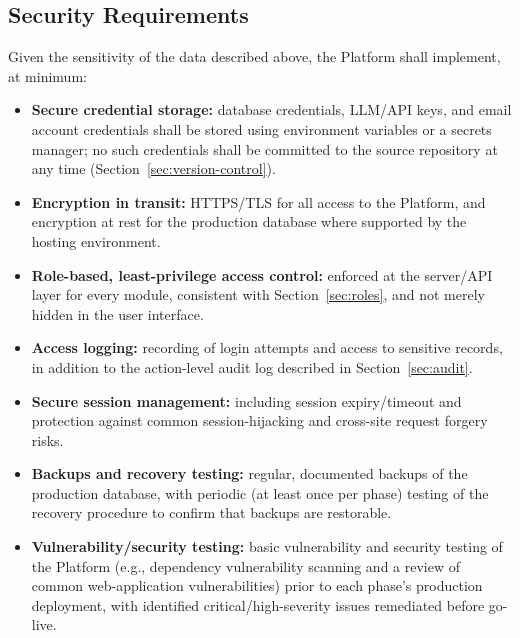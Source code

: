 \documentclass[11pt]{article}
\begin{document}
\subsection{Security Requirements}
\label{sec:security}
Given the sensitivity of the data described above, the Platform shall implement, at minimum:
\begin{itemize}[leftmargin=1.4em, itemsep=3pt]
\item \textbf{Secure credential storage:} database credentials, LLM/API keys, and email account credentials shall be stored using environment variables or a secrets manager; no such credentials shall be committed to the source repository at any time (Section~\ref{sec:version-control}).
\item \textbf{Encryption in transit:} HTTPS/TLS for all access to the Platform, and encryption at rest for the production database where supported by the hosting environment.
\item \textbf{Role-based, least-privilege access control:} enforced at the server/API layer for every module, consistent with Section~\ref{sec:roles}, and not merely hidden in the user interface.
\item \textbf{Access logging:} recording of login attempts and access to sensitive records, in addition to the action-level audit log described in Section~\ref{sec:audit}.
\item \textbf{Secure session management:} including session expiry/timeout and protection against common session-hijacking and cross-site request forgery risks.
\item \textbf{Backups and recovery testing:} regular, documented backups of the production database, with periodic (at least once per phase) testing of the recovery procedure to confirm that backups are restorable.
\item \textbf{Vulnerability/security testing:} basic vulnerability and security testing of the Platform (e.g., dependency vulnerability scanning and a review of common web-application vulnerabilities) prior to each phase's production deployment, with identified critical/high-severity issues remediated before go-live.
\end{itemize}

\end{document}
